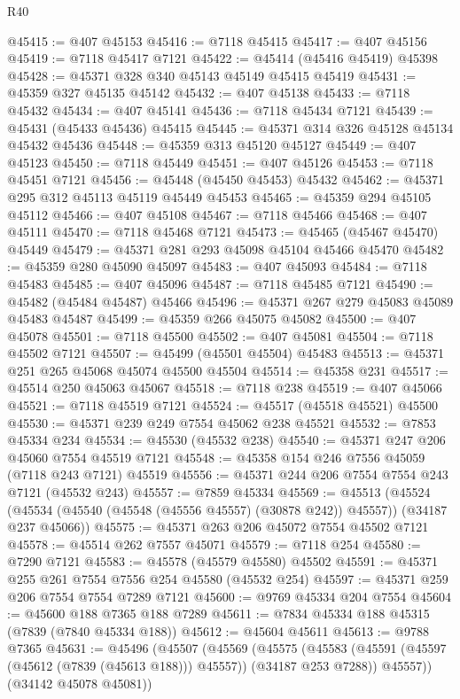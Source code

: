 \begin{lexlean}{R40}
\begin{coremodule}
@45415 := @407 @45153
@45416 := @7118 @45415
@45417 := @407 @45156
@45419 := @7118 @45417 @7121
@45422 := @45414 (@45416 @45419) @45398
@45428 := @45371 @328 @340 @45143 @45149 @45415 @45419
@45431 := @45359 @327 @45135 @45142
@45432 := @407 @45138
@45433 := @7118 @45432
@45434 := @407 @45141
@45436 := @7118 @45434 @7121
@45439 := @45431 (@45433 @45436) @45415
@45445 := @45371 @314 @326 @45128 @45134 @45432 @45436
@45448 := @45359 @313 @45120 @45127
@45449 := @407 @45123
@45450 := @7118 @45449
@45451 := @407 @45126
@45453 := @7118 @45451 @7121
@45456 := @45448 (@45450 @45453) @45432
@45462 := @45371 @295 @312 @45113 @45119 @45449 @45453
@45465 := @45359 @294 @45105 @45112
@45466 := @407 @45108
@45467 := @7118 @45466
@45468 := @407 @45111
@45470 := @7118 @45468 @7121
@45473 := @45465 (@45467 @45470) @45449
@45479 := @45371 @281 @293 @45098 @45104 @45466 @45470
@45482 := @45359 @280 @45090 @45097
@45483 := @407 @45093
@45484 := @7118 @45483
@45485 := @407 @45096
@45487 := @7118 @45485 @7121
@45490 := @45482 (@45484 @45487) @45466
@45496 := @45371 @267 @279 @45083 @45089 @45483 @45487
@45499 := @45359 @266 @45075 @45082
@45500 := @407 @45078
@45501 := @7118 @45500
@45502 := @407 @45081
@45504 := @7118 @45502 @7121
@45507 := @45499 (@45501 @45504) @45483
@45513 := @45371 @251 @265 @45068 @45074 @45500 @45504
@45514 := @45358 @231
@45517 := @45514 @250 @45063 @45067
@45518 := @7118 @238
@45519 := @407 @45066
@45521 := @7118 @45519 @7121
@45524 := @45517 (@45518 @45521) @45500
@45530 := @45371 @239 @249 @7554 @45062 @238 @45521
@45532 := @7853 @45334 @234
@45534 := @45530 (@45532 @238)
@45540 := @45371 @247 @206 @45060 @7554 @45519 @7121
@45548 := @45358 @154 @246 @7556 @45059 (@7118 @243 @7121) @45519
@45556 := @45371 @244 @206 @7554 @7554 @243 @7121 (@45532 @243)
@45557 := @7859 @45334
@45569 := @45513
    (@45524 (@45534 (@45540 (@45548 (@45556 @45557) (@30878 @242)) @45557)) (@34187 @237 @45066))
@45575 := @45371 @263 @206 @45072 @7554 @45502 @7121
@45578 := @45514 @262 @7557 @45071
@45579 := @7118 @254
@45580 := @7290 @7121
@45583 := @45578 (@45579 @45580) @45502
@45591 := @45371 @255 @261 @7554 @7556 @254 @45580 (@45532 @254)
@45597 := @45371 @259 @206 @7554 @7554 @7289 @7121
@45600 := @9769 @45334 @204 @7554
@45604 := @45600 @188 @7365 @188 @7289
@45611 := @7834 @45334 @188 @45315 (@7839 (@7840 @45334 @188))
@45612 := @45604 @45611
@45613 := @9788 @7365
@45631 := @45496
    (@45507
      (@45569
        (@45575
          (@45583 (@45591 (@45597 (@45612 (@7839 (@45613 @188))) @45557)) (@34187 @253 @7288))
          @45557))
      (@34142 @45078 @45081))

\end{coremodule}
\end{lexlean}
